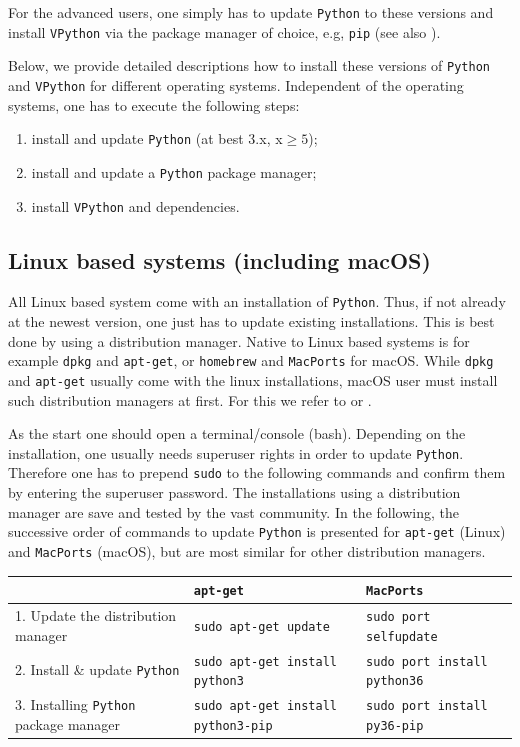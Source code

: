 \documentclass[12pt,ngerman,american]{iopart}
\newcommand{\python}[0]{\texttt{Python}}
\newcommand{\vpython}[0]{\texttt{VPython}}
\newcommand{\code}[1]{{\scriptsize\colorbox{light-gray}{\texttt{#1}}}}
\begin{document}
For the advanced users, one simply has to update \python{} to these versions and install \vpython{} via the package manager of choice, e.g, \texttt{pip} (see also \cite{VPython}).

Below, we provide detailed descriptions how to install these versions of \python{} and \vpython{} for different operating systems.
Independent of the operating systems, one has to execute the following steps:
\begin{enumerate}
	\item install and update \python{} (at best 3.x, x$\geq5$);
	\item install and update a \python{} package manager;
	\item install \vpython{} and dependencies.
\end{enumerate}

\subsection{Linux based systems (including macOS)}\label{appendix:python-max}
All Linux based system come with an installation of \python{}.
Thus, if not already at the newest version, one just has to update existing installations.
This is best done by using a distribution manager.
Native to Linux based systems is for example \texttt{dpkg} and \texttt{apt-get}, or \texttt{homebrew} and \texttt{MacPorts} for macOS.
While \texttt{dpkg} and \texttt{apt-get} usually come with the linux installations, macOS user must install such distribution managers at first.
For this we refer to \cite{MacPorts} or \cite{Homebrew}.

As the start one should open a terminal/console (bash).
Depending on the installation, one usually needs superuser rights in order to update \python{}.
Therefore one has to prepend \code{sudo} to the following commands and confirm them by entering the superuser password.
The installations using a distribution manager are save and tested by the vast community.
In the following, the successive order of commands to update \python{} is presented for \texttt{apt-get} (Linux) and \texttt{MacPorts} (macOS), but are most similar for other distribution managers.
\begin{table}[h!]
\centering
\footnotesize
\begin{tabular}{l || l | l}
	& \texttt{apt-get} & \texttt{MacPorts} \\\hline
	1. Update the distribution manager & \code{sudo apt-get update} & \code{sudo port selfupdate} \\
	2. Install \& update \python{} & \code{sudo apt-get install python3} & \code{sudo port install python36} \\
	3. Installing \python{} package manager & \code{sudo apt-get install python3-pip} & \code{sudo port install py36-pip}
\end{tabular}
\normalsize
\end{table}
\end{document}
